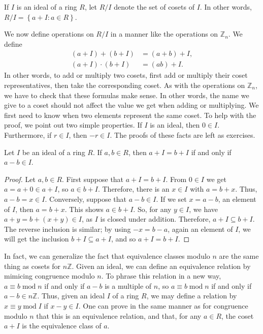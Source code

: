 \begin{definition}
If $I$ is an ideal of a ring $R$, let $R/I$ denote the set of cosets of $I$.
In other words, $R/I=\left\{  a+I:a\in R\right\}  $.
\end{definition}

We now define operations on $R/I$ in a manner like the operations on
$\mathbb{Z}_{n}$. We define
\begin{align*}
\left(  a+I\right)  +\left(  b+I\right)   &  =(a+b)+I,\\
\left(  a+I\right)  \cdot\left(  b+I\right)   &  =(ab)+I.
\end{align*}
In other words, to add or multiply two cosets, first add or multiply their
coset representatives, then take the corresponding coset. As with the
operations on $\mathbb{Z}_{n}$, we have to check that these formulas make
sense. In other words, the name we give to a coset should not affect the value
we get when adding or multiplying. We first need to know when two elements
represent the same coset. To help with the proof, we point out two simple
properties. If $I$ is an ideal, then $0\in I$. Furthermore, if $r\in I $, then
$-r\in I$. The proofs of these facts are left as exercises.

\begin{lemma}
Let $I$ be an ideal of a ring $R$. If $a,b\in R$, then $a+I=b+I$ if and only
if $a-b\in I$.
\end{lemma}

\begin{proof}
Let $a,b\in R$. First suppose that $a+I=b+I$. From $0\in I$ we get $a=a+0\in
a+I$, so $a\in b+I$. Therefore, there is an $x\in I$ with $a=b+x$. Thus,
$a-b=x\in I$. Conversely, suppose that $a-b\in I$. If we set $x=a-b$, an
element of $I$, then $a=b+x$. This shows $a\in b+I$. So, for any $y\in I$, we
have $a+y=b+(x+y)\in I$, as $I$ is closed under addition. Therefore,
$a+I\subseteq b+I$. The reverse inclusion is similar; by using $-x=b-a$, again
an element of $I$, we will get the inclusion $b+I\subseteq a+I$, and so
$a+I=b+I$.
\end{proof}


In fact, we can generalize the fact that equivalence classes modulo $n$ are
the same thing as cosets for $n\mathbb{Z}$. Given an ideal, we can define an
equivalence relation by mimicing congruence modulo $n$. To phrase this
relation in a new way, $a\equiv b\operatorname{mod}n$ if and only if $a-b$ is
a multiple of $n$, so $a\equiv b\operatorname{mod}n$ if and only if $a-b\in
n\mathbb{Z} $. Thus, given an ideal $I$ of a ring $R$, we may define a
relation by $x\equiv y\operatorname{mod}I$ if $x-y\in I$. One can prove in the
same manner as for congruence modulo $n$ that this is an equivalence relation,
and that, for any $a\in R$, the coset $a+I$ is the equivalence class of $a$.

